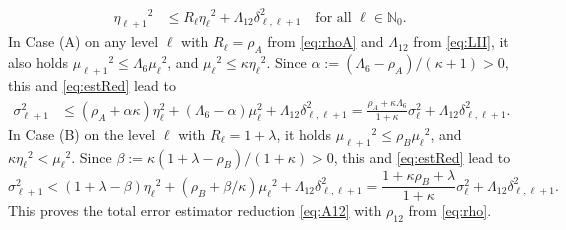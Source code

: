 \documentclass{siamltex1213}
\begin{document}
		\begin{align}
			{\eta_{{\ell+1}}}^2 &\leq {\ensuremath{R_\ell}} {\eta_{{\ell}}}^2 + {\ensuremath{\Lambda_{\mathrm{12}}}} \delta^2_{\ell,\ell+1}
			\quad \text{for all } \ell\in {\mathbb{N}_0}. \label{eq:estRed}
		\end{align}
		In Case (A) on any level $\ell$ with ${\ensuremath{R_\ell}}=\rho_{A}$ from \eqref{eq:rhoA} and ${\ensuremath{\Lambda_{\mathrm{12}}}}$ from \eqref{eq:LII}, it also holds ${\mu_{{\ell+1}}}^2 \leq {\ensuremath{\Lambda_{\mathrm{6}}}}{\mu_{{\ell}}}^2$, and ${\mu_{{\ell}}}^2 \leq \kappa {\eta_{{\ell}}}^2$.
	Since $\alpha:=({\ensuremath{\Lambda_{\mathrm{6}}}}-\rho_A)/(\kappa+1) >0$, this and \cref{eq:estRed} lead to
	\begin{align*}
		\sigma_{\ell+1}^2 &\leq (\rho_{A} +\alpha \kappa )\eta_\ell^2 
		+ ({\ensuremath{\Lambda_{\mathrm{6}}}}-\alpha) \mu_\ell^2+ {\ensuremath{\Lambda_{\mathrm{12}}}} \delta^2_{\ell, \ell+1}
		=\frac{\rho_A+\kappa{\ensuremath{\Lambda_{\mathrm{6}}}}}{1+\kappa}\sigma_\ell^2+ {\ensuremath{\Lambda_{\mathrm{12}}}} \delta^2_{\ell, \ell+1}.
	\end{align*}
	In Case (B) on the level $\ell$ with ${\ensuremath{R_\ell}}=1+\lambda$, it  holds ${\mu_{{\ell+1}}}^2 \leq 
	 \rho_B {\mu_{{\ell}}}^2$, and $\kappa {\eta_{{\ell}}}^2<{\mu_{{\ell}}}^2$.
		Since $\beta:=\kappa(1+\lambda-\rho_B )/(1+\kappa)>0$, 
		this and \cref{eq:estRed} lead to
		\[
			\sigma_{\ell+1}^2 < (1+\lambda-\beta){\eta_{{\ell}}}^2 
			+ (\rho_B + \beta/\kappa) {\mu_{{\ell}}}^2 + {\ensuremath{\Lambda_{\mathrm{12}}}} \delta^2_{\ell,\ell+1}
			= \frac{1+\kappa\rho_B +\lambda}{1+\kappa}\sigma_{\ell}^2  
			+ {\ensuremath{\Lambda_{\mathrm{12}}}} \delta^2_{\ell,\ell+1}.
	\]
	This proves the total error estimator reduction \cref{eq:A12} with $\rho_{12}$ from \cref{eq:rho}. \qquad \endproof
\end{document}
